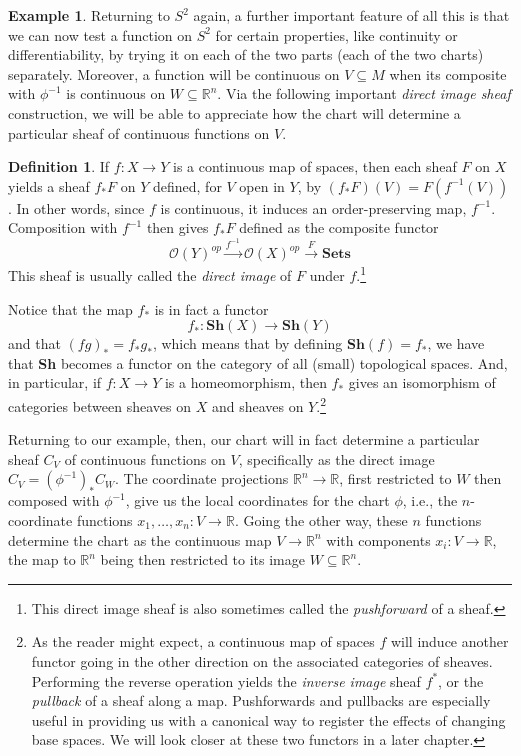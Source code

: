 \documentclass[11pt]{book}
\theoremstyle{definition}
\newtheorem{example}{Example}[section]
\theoremstyle{definition}
\newtheorem{definition}{Definition}[section]
\theoremstyle{definition}
\theoremstyle{theorem}
\theoremstyle{definition}
\begin{document}
\begin{example}
		Returning to $S^2$ again, a further important feature of all this is that we can now test a function on $S^2$ for certain properties, like continuity or differentiability, by trying it on each of the two parts (each of the two charts) separately. Moreover, a function will be continuous on $V \subseteq M$ when its composite with $\phi^{-1}$ is continuous on $W \subseteq \mathbb{R}^n$. Via the following important \textit{direct image sheaf} construction, we will be able to appreciate how the chart will determine a particular sheaf of continuous functions on $V$. 
		\begin{definition}
			If $f: X \rightarrow Y$ is a continuous map of spaces, then each sheaf $F$ on $X$ yields a sheaf $f_{*}F$ on $Y$ defined, for $V$ open in $Y$, by $(f_{*}F) (V) = F(f^{-1}(V))$. In other words, since $f$ is continuous, it induces an order-preserving map, $f^{-1}$. Composition with $f^{-1}$ then gives $f_{*}F$ defined as the composite functor 
			\begin{equation}
			\mathscr{O}(Y)^{op} \xrightarrow{f^{-1}} \mathscr{O}(X)^{op} \xrightarrow{F} \textbf{Sets}
			\end{equation}
			This sheaf is usually called the \textit{direct image} of $F$ under $f$.\footnote{This direct image sheaf is also sometimes called the \textit{pushforward} of a sheaf.} 
		\end{definition} \noindent 
		Notice that the map $f_{*}$ is in fact a functor 
		\begin{equation}
		f_{*}: \textbf{Sh}(X) \rightarrow \textbf{Sh}(Y)
		\end{equation}
		and that $(fg)_{*} = f_* g_*$, which means that by defining $\textbf{Sh}(f) = f_*$, we have that \textbf{Sh} becomes a functor on the category of all (small) topological spaces. And, in particular, if $f: X \rightarrow Y$ is a homeomorphism, then $f_*$ gives an isomorphism of categories between sheaves on $X$ and sheaves on $Y$.\footnote{As the reader might expect, a continuous map of spaces $f$ will induce another functor going in the other direction on the associated categories of sheaves. Performing the reverse operation yields the \textit{inverse image} sheaf $f^*$, or the \textit{pullback} of a sheaf along a map. Pushforwards and pullbacks are especially useful in providing us with a canonical way to register the effects of changing base spaces. We will look closer at these two functors in a later chapter.} \par 
		Returning to our example, then, our chart will in fact determine a particular sheaf $C_V$ of continuous functions on $V$, specifically as the direct image $C_V = (\phi^{-1})_* C_W$. The coordinate projections $\mathbb{R}^n \rightarrow \mathbb{R}$, first restricted to $W$ then composed with $\phi^{-1}$, give us the local coordinates for the chart $\phi$, i.e., the $n$-coordinate functions $x_1, \dots, x_n: V \rightarrow \mathbb{R}$. Going the other way, these $n$ functions determine the chart as the continuous map $V \rightarrow \mathbb{R}^n$ with components $x_i: V \rightarrow \mathbb{R}$, the map to $\mathbb{R}^n$ being then restricted to its image $W \subseteq \mathbb{R}^n$. \par 

\end{example}
\end{document}
